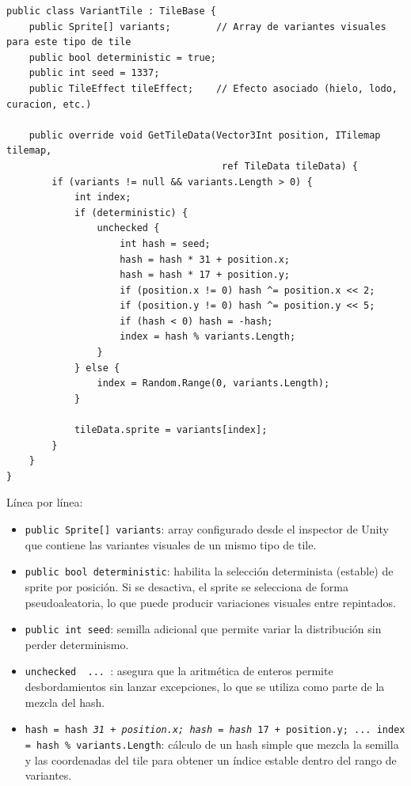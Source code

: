 \begin{lstlisting}
public class VariantTile : TileBase {
    public Sprite[] variants;        // Array de variantes visuales para este tipo de tile
    public bool deterministic = true;
    public int seed = 1337;
    public TileEffect tileEffect;    // Efecto asociado (hielo, lodo, curacion, etc.)
    
    public override void GetTileData(Vector3Int position, ITilemap tilemap, 
                                      ref TileData tileData) {
        if (variants != null && variants.Length > 0) {
            int index;
            if (deterministic) {
                unchecked {
                    int hash = seed;
                    hash = hash * 31 + position.x;
                    hash = hash * 17 + position.y;
                    if (position.x != 0) hash ^= position.x << 2;
                    if (position.y != 0) hash ^= position.y << 5;
                    if (hash < 0) hash = -hash;
                    index = hash % variants.Length;
                }
            } else {
                index = Random.Range(0, variants.Length);
            }

            tileData.sprite = variants[index];
        }
    }
}
\end{lstlisting}


Línea por línea:

\begin{itemize}
\item \texttt{public Sprite[] variants}: array configurado desde el inspector de Unity que contiene las variantes visuales de un mismo tipo de tile.
\item \texttt{public bool deterministic}: habilita la selección determinista (estable) de sprite por posición. Si se desactiva, el sprite se selecciona de forma pseudoaleatoria, lo que puede producir variaciones visuales entre repintados.
\item \texttt{public int seed}: semilla adicional que permite variar la distribución sin perder determinismo.
\item \texttt{unchecked { ... }}: asegura que la aritmética de enteros permite desbordamientos sin lanzar excepciones, lo que se utiliza como parte de la mezcla del hash.
\item \texttt{hash = hash \textit{ 31 + position.x; hash = hash } 17 + position.y; ... index = hash \% variants.Length}: cálculo de un hash simple que mezcla la semilla y las coordenadas del tile para obtener un índice estable dentro del rango de variantes.
\end{itemize}

